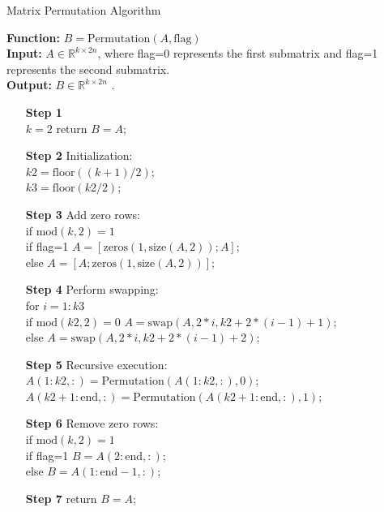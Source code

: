 \documentclass[1p]{elsarticle}
\numberwithin{equation}{section}
\begin{document}
\begin{algorithm}[htbp]
    \caption{Matrix Permutation Algorithm} \label{alg:Permutation}
    \textbf{Function:} $B=\text{Permutation}(A,\text{flag})$\\	
    \textbf{Input:}  $ A \in \mathbb{R}^{k \times 2n}$, where flag=0 represents the first submatrix and flag=1 represents the second submatrix.\\
    \textbf{Output:} $B \in \mathbb{R}^{k \times 2n}$ .
\begin{itemize}
    \item[\textbf{Step 1}]\\
         $k=2$ \quad return $B=A$;
    \item[\textbf{Step 2}] Initialization:\\
        $k2 = \text{floor}((k+1)/2)$;\\
        $k3 = \text{floor}(k2/2)$;
    \item[\textbf{Step 3}] Add zero rows:\\
        if $\text{mod}(k, 2)=1$ \\
        if flag=1 \quad $A = [\text{zeros}(1, \text{size}(A, 2)); A]$;\\
        else  $A = [A; \text{zeros}(1, \text{size}(A, 2))]$;
    \item[\textbf{Step 4}] Perform swapping:\\
       for $i=1:k3$\\
       if $\text{mod}(k2, 2)=0$ \quad
        $A= \text{swap}(A,2*i,k2+2*(i-1)+1)$;\\
       else
        $A= \text{swap}(A,2*i,k2+2*(i-1)+2)$;
    \item[\textbf{Step 5}] Recursive execution:\\
       $A(1:k2, :) = \text{Permutation}(A(1:k2, :), 0)$;\\
       $A(k2+1:\text{end}, :) = \text{Permutation}(A(k2+1:\text{end}, :), 1)$;
    \item[\textbf{Step 6}] Remove zero rows: \\
       if $\text{mod}(k, 2)=1$ \\
       if flag=1 \quad $B = A(2:\text{end}, :)$;\\
       else $B = A(1:\text{end}-1, :)$;
    \item[\textbf{Step 7}] return $B=A$;
\end{itemize}
\end{algorithm}
\end{document}
